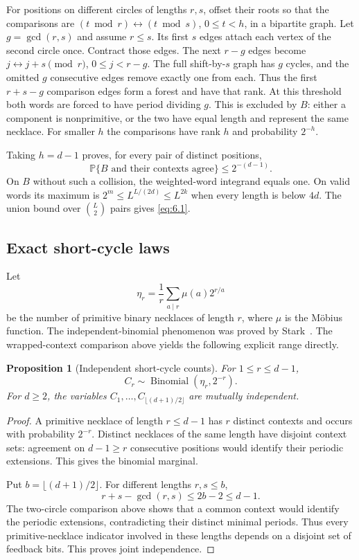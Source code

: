 \documentclass[11pt]{article}
\newtheorem{proposition}[theorem]{Proposition}
\theoremstyle{remark}
\begin{document}
For positions on different circles of lengths \(r,s\), offset their
roots so that the comparisons are
\((t\bmod r)\leftrightarrow(t\bmod s)\), \(0\le t<h\), in a bipartite
graph. Let \(g=\gcd(r,s)\) and assume \(r\le s\). Its first \(s\) edges
attach each vertex of the second circle once. Contract those edges. The
next \(r-g\) edges become \(j\leftrightarrow j+s\pmod r\),
\(0\le j<r-g\). The full shift-by-\(s\) graph has \(g\) cycles, and the
omitted \(g\) consecutive edges remove exactly one from each. Thus the
first \(r+s-g\) comparison edges form a forest and have that rank. At
this threshold both words are forced to have period dividing \(g\). This
is excluded by \(B\): either a component is nonprimitive, or the two
have equal length and represent the same necklace. For smaller \(h\) the
comparisons have rank \(h\) and probability \(2^{-h}\).

Taking \(h=d-1\) proves, for every pair of distinct positions, \[
 \mathbb P\{B\text{ and their contexts agree}\}\le2^{-(d-1)}.
\] On \(B\) without such a collision, the weighted-word integrand equals
one. On valid words its maximum is \(2^m\le L^{L/(2d)}\le L^{2k}\) when
every length is below \(4d\). The union bound over \(\binom L2\) pairs
gives \eqref{eq:6.1}.

\subsection{Exact short-cycle laws}
Let
\[
 \eta_r=\frac1r\sum_{a\mid r}\mu(a)2^{r/a}
\]
be the number of primitive binary necklaces of length $r$, where $\mu$ is
the M\"obius function. The independent-binomial phenomenon was proved by
Stark~\cite{Stark}. The wrapped-context comparison above yields the following
explicit range directly.

\begin{proposition}[Independent short-cycle counts]\label{prop:short-cycles}
For $1\le r\le d-1$,
\[
 C_r\sim\operatorname{Binomial}(\eta_r,2^{-r}).
\]
For $d\ge2$, the variables
$C_1,\ldots,C_{\lfloor(d+1)/2\rfloor}$ are mutually independent.
\end{proposition}
\begin{proof}
A primitive necklace of length $r\le d-1$ has $r$ distinct contexts and
occurs with probability $2^{-r}$. Distinct necklaces of the same length
have disjoint context sets: agreement on $d-1\ge r$ consecutive positions
would identify their periodic extensions. This gives the binomial marginal.

Put $b=\lfloor(d+1)/2\rfloor$. For different lengths $r,s\le b$,
\[
 r+s-\gcd(r,s)\le2b-2\le d-1.
\]
The two-circle comparison above shows that a common context would identify
the periodic extensions, contradicting their distinct minimal periods.
Thus every primitive-necklace indicator involved in these lengths depends
on a disjoint set of feedback bits. This proves joint independence.
\end{proof}
\end{document}
